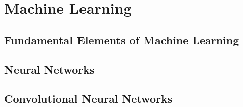 %
%

\part{Machine Learning}\label{part:machine_learning}

\chapter{Fundamental Elements of Machine Learning}\label{ch:machine_learning:fundamental_elements_of_machine_learning}


\chapter{Neural Networks}\label{ch:machine_learning:neural_networks}


\chapter{Convolutional Neural Networks}\label{ch:machine_learning:convolutional_neural_networks}
